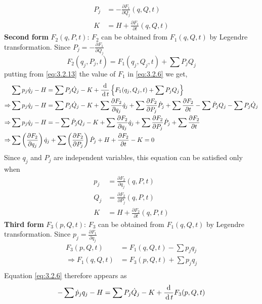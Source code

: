 \documentclass[12pt]{article}
\begin{document}
\begin{soln}
\begin{align*}
        P_j&=-\frac{\partial F_1}{\partial Q_j}(q,Q,t)\\
        K&=H+\frac{\partial F_1}{\partial t}(q,Q,t)
    \end{align*}
    \textbf{Second form} \(F_2(q,P,t)\): \(F_2\) can be obtained from \(F_1(q,Q,t)\) by Legendre transformation. Since \(P_j=-\frac{\partial F_1}{\partial Q_j}\)
    \begin{equation}
        F_2(q_j,P_j,t)=F_1(q_j,Q_j,t)+\sum P_j{Q}_j \label{eq:3.2.13}
    \end{equation}
    putting from \eqref{eq:3.2.13} the value of \(F_1\) in \eqref{eq:3.2.6} we get,
    \begin{align*}
        & \sum p_j\dot{q}_j-H =\sum P_j\dot{Q}_j-K+\frac{\,\mathrm{d}\, }{\,\mathrm{d}\, t}\left\{ F_1(q_j,Q_j,t)+\sum P_j{Q}_j \right\}\\
        \Rightarrow & \sum p_j\dot{q}_j-H =\sum P_j\dot{Q}_j-K+  \sum \frac{\partial F_2}{\partial q_j}\dot{q}_j+\sum \frac{\partial F_2}{\partial P_j}\dot{P}_j+\sum \frac{\partial F_2}{\partial t}-\sum \dot{P}_jQ_j-\sum P_j\dot{Q}_j\\
        \Rightarrow & \sum p_j\dot{q}_j-H =-\sum \dot{P}_j{Q}_j-K+  \sum \frac{\partial F_2}{\partial q_j}\dot{q}_j+\sum \frac{\partial F_2}{\partial P_j}\dot{P}_j+\sum \frac{\partial F_2}{\partial t}\\
        \Rightarrow&\sum \left( \frac{\partial F_2}{\partial q_j} \right)\dot{q}_j+\sum \left( \frac{\partial F_2}{\partial P_j} \right)\dot{P}_j+H+\frac{\partial F_2}{\partial t}-K=0
    \end{align*}
    Since \(q_j\) and \(P_j\) are independent variables, this equation can be satisfied only when
    \begin{align*}
        p_j&=\frac{\partial F_2}{\partial q_j}(q,P,t)\\
        Q_j&=\frac{\partial F_2}{\partial P_j}(q,P,t)\\
        K&=H+\frac{\partial F_2}{\partial t}(q,P,t)
    \end{align*}
    \textbf{Third form} \(F_3(p,Q,t)\):  \(F_3\) can be obtained from \(F_1(q,Q,t)\) by Legendre transformation. Since \(p_j=\frac{\partial F_1}{\partial q_j}\)
    \begin{align*}
        F_3(p,Q,t)&=F_1(q,Q,t)-\sum p_jq_j\\
        \Rightarrow F_1(q,Q,t)&=F_3(p,Q,t)+\sum p_jq_j\\
    \end{align*}
    Equation \eqref{eq:3.2.6} therefore appears as
    \[-\sum \dot{p}_jq_j-H=\sum P_j\dot{Q}_j-K+\frac{\,\mathrm{d}\,}{\,\mathrm{d}\, t}F_3(p,Q,t)\]

\end{soln}
\end{document}
